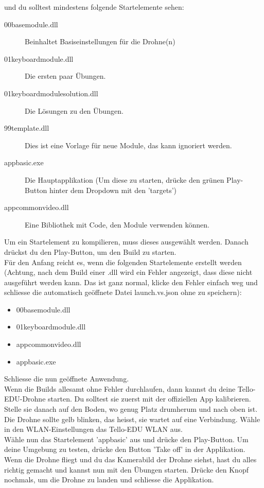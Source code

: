 und du solltest mindestens folgende Startelemente sehen:
\begin{description}
    \item[00\textunderscore base\textunderscore module.dll] Beinhaltet Basiseinstellungen für die Drohne(n)
    \item[01\textunderscore keyboard\textunderscore module.dll] Die ersten paar Übungen.
    \item[01\textunderscore keyboard\textunderscore module\textunderscore solution.dll] Die Lösungen zu den Übungen.
    \item[99\textunderscore template.dll] Dies ist eine Vorlage für neue Module, das kann ignoriert werden.
    \item[app\textunderscore basic.exe] Die Hauptapplikation (Um diese zu starten, drücke den grünen Play-Button hinter dem Dropdown mit den 'targets')
    \item[app\textunderscore common\textunderscore video.dll] Eine Bibliothek mit Code, den Module verwenden können.
\end{description}
Um ein Startelement zu kompilieren, muss dieses ausgewählt werden. Danach drückst du den Play-Button, um den Build
zu starten.\\
Für den Anfang reicht es, wenn die folgenden Startelemente erstellt werden (Achtung, nach dem Build einer .dll wird ein
Fehler angezeigt, dass diese nicht ausgeführt werden kann. Das ist ganz normal, klicke den Fehler einfach weg und
schliesse die automatisch geöffnete Datei launch.vs.json ohne zu speichern):
\begin{itemize}
    \item 00\textunderscore base\textunderscore module.dll
    \item 01\textunderscore keyboard\textunderscore module.dll
    \item app\textunderscore common\textunderscore video.dll
    \item app\textunderscore basic.exe
\end{itemize}
Schliesse die nun geöffnete Anwendung.\\
Wenn die Builds allesamt ohne Fehler durchlaufen, dann kannst du deine Tello-EDU-Drohne starten.
Du solltest sie zuerst mit der offiziellen App kalibrieren.
Stelle sie danach auf den Boden, wo genug Platz drumherum und nach oben ist. Die Drohne sollte gelb blinken, das heisst,
sie wartet auf eine Verbindung. Wähle in den WLAN-Einstellungen das Tello-EDU WLAN aus.\\
Wähle nun das Startelement 'app\textunderscore basic' aus und drücke den Play-Button. Um deine Umgebung zu testen, drücke
den Button 'Take off' in der Applikation. Wenn die Drohne fliegt und du das Kamerabild der Drohne siehst, hast du alles richtig gemacht
und kannst nun mit den Übungen starten. Drücke den Knopf nochmals, um die Drohne zu landen und schliesse die Applikation.